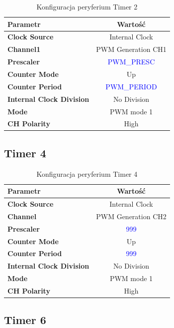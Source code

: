 \documentclass[10pt, a4paper]{article}
\begin{document}
\begin{table}[H]
	\centering
	\begin{tabular}{|l|c|} \hline
		\textbf{Parametr} & Wartość \\
		\hline
		\hline  \textbf{Clock Source}&Internal Clock  \\\hline
		\textbf{Channel1} & PWM Generation CH1\\\hline
		\textbf{Prescaler} & \textcolor{blue}{PWM\_PRESC}\\\hline
		\textbf{Counter Mode} &  Up\\
		\hline
		\textbf{Counter Period}& \textcolor{blue}{PWM\_PERIOD}\\\hline
		\textbf{Internal Clock Division}& No Division\\
		\hline
		\textbf{Mode}& PWM mode 1\\
		\hline
		\textbf{CH Polarity}& High\\
		\hline
	\end{tabular}
	\caption{Konfiguracja peryferium Timer 2}
	\label{tab:Timer2}
\end{table}

\subsection{Timer 4}

\begin{table}[H]
	\centering
	\begin{tabular}{|l|c|} \hline
		\textbf{Parametr} & Wartość \\
		\hline
		\hline  \textbf{Clock Source}&Internal Clock  \\\hline
		\textbf{Channel} & PWM Generation CH2\\\hline
		\textbf{Prescaler} & \textcolor{blue}{999}\\\hline
		\textbf{Counter Mode} &  Up\\
		\hline
		\textbf{Counter Period}& \textcolor{blue}{999}\\\hline
		\textbf{Internal Clock Division}& No Division\\
		\hline
		\textbf{Mode}& PWM mode 1\\
		\hline
		\textbf{CH Polarity}& High\\
		\hline
	\end{tabular}
	\caption{Konfiguracja peryferium Timer 4}
	\label{tab:Timer4}
\end{table}

\subsection{Timer 6}
\end{document}
